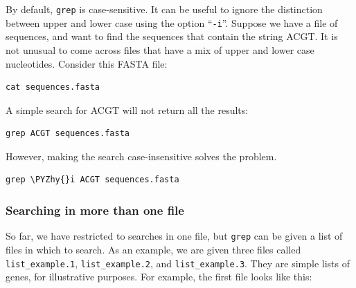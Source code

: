 \documentclass[11pt]{article}
\makeatletter
\def\PYZhy{\char`\-}
\newcommand{\boxspacing}{\kern\kvtcb@left@rule\kern\kvtcb@boxsep}
\newcommand{\prompt}[4]{
        {\ttfamily\llap{{\color{blue}\LARGE\faKeyboardO\hspace{3pt}#4}}\vspace{-\baselineskip}}
    }
\makeatother
\begin{document}
By default, \texttt{grep} is case-sensitive. It can be useful to ignore
the distinction between upper and lower case using the option
``\texttt{-i}''. Suppose we have a file of sequences, and want to find
the sequences that contain the string ACGT. It is not unusual to come
across files that have a mix of upper and lower case nucleotides.
Consider this FASTA file:

    \begin{tcolorbox}[breakable, size=fbox, boxrule=1pt, pad at break*=1mm,colback=cellbackground, colframe=cellborder]
\prompt{In}{incolor}{ }{\boxspacing}
\begin{Verbatim}[commandchars=\\\{\}]
cat sequences.fasta
\end{Verbatim}
\end{tcolorbox}

    A simple search for ACGT will not return all the results:

    \begin{tcolorbox}[breakable, size=fbox, boxrule=1pt, pad at break*=1mm,colback=cellbackground, colframe=cellborder]
\prompt{In}{incolor}{ }{\boxspacing}
\begin{Verbatim}[commandchars=\\\{\}]
grep ACGT sequences.fasta
\end{Verbatim}
\end{tcolorbox}

    However, making the search case-insensitive solves the problem.

    \begin{tcolorbox}[breakable, size=fbox, boxrule=1pt, pad at break*=1mm,colback=cellbackground, colframe=cellborder]
\prompt{In}{incolor}{ }{\boxspacing}
\begin{Verbatim}[commandchars=\\\{\}]
grep \PYZhy{}i ACGT sequences.fasta
\end{Verbatim}
\end{tcolorbox}

    \hypertarget{searching-in-more-than-one-file}{%
\subsubsection{Searching in more than one
file}\label{searching-in-more-than-one-file}}

So far, we have restricted to searches in one file, but \texttt{grep}
can be given a list of files in which to search. As an example, we are
given three files called \texttt{list\_example.1},
\texttt{list\_example.2}, and \texttt{list\_example.3}. They are simple
lists of genes, for illustrative purposes. For example, the first file
looks like this:
\end{document}
